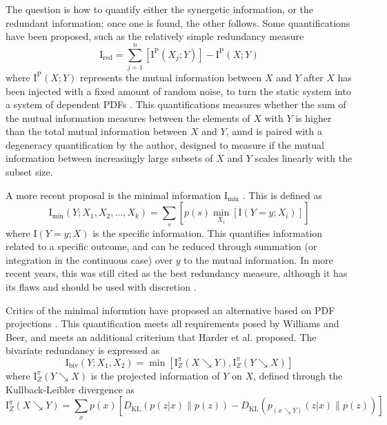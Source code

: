 \documentclass[../main.tex]{subfiles}
\begin{document}
The question is how to quantify either the synergetic information, or the redundant information; once one is found, the other follows.
Some quantifications have been proposed, such as the relatively simple redundancy measure
%
\begin{equation}
\mathrm{I}_\mathrm{red} = \sum_{j=1}^n [\mathrm{I}^\mathrm{P}(X_j;Y)] - \mathrm{I}^\mathrm{P}(X;Y)
\end{equation}
%
where $\mathrm{I}^\mathrm{P}(X;Y)$ represents the mutual information between $X$ and $Y$ after $X$ has been injected with a fixed amount of random noise, to turn the static system into a system of dependent PDFs \cite{tononi1999measures}.
This quantifications measures whether the sum of the mutual information measures between the elements of $X$ with $Y$ is higher than the total mutual information between $X$ and $Y$, annd is paired with a degeneracy quantification by the author, designed to measure if the mutual information between increasingly large subsets of $X$ and $Y$ scales linearly with the subset size.

A more recent proposal is the minimal information $\mathrm{I}_\mathrm{min}$ \cite{williams2010nonnegative}.
This is defined as
%
\begin{equation}
\mathrm{I}_\mathrm{min}(Y;{X_1, X_2,...,X_k}) = \sum_s [p(s) \min_{X_i} [\mathrm{I}(Y=y;X_i)]]
\end{equation}
%
where $\mathrm{I}(Y = y;X)$ is the specific information.
This quantifies information related to a specific outcome, and can be reduced through summation (or integration in the continuous case) over $y$ to the mutual information.
In more recent years, this was still cited as the best redundancy measure, although it has its flaws and should be used with discretion \cite{lizier2013towards, olbrich2015information}.

Critics of the minimal informtion have proposed an alternative based on PDF projections \cite{harder2013bivariate}.
This quantification meets all requirements posed by Williams and Beer, and meets an additional criterium that Harder et al. proposed.
The bivariate redundancy is expressed as
%
\begin{equation}
\mathrm{I}_\mathrm{biv}(Y;{X_1, X_2}) = \min [\mathrm{I}_Z^\pi (X \searrow Y), \mathrm{I}_Z^\pi (Y \searrow X)] 
\end{equation}
%
where $\mathrm{I}_Z^\pi (Y \searrow X)$ is the projected information of $Y$ on $X$, defined through the Kullback-Leibler divergence as
%
\begin{equation}
\mathrm{I}_Z^\pi (X \searrow Y) = \sum_x p(x) [D_\mathrm{KL} (p(z|x) \| p(z)) - D_\mathrm{KL} (p_{(x \searrow Y)}(z|x) \| p(z))]
\end{equation}
\end{document}
